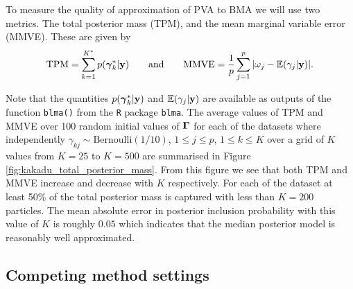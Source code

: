 \noindent To measure the quality of approximation of PVA to BMA we will use two
metrics. The total posterior mass (TPM), and the mean marginal variable error
(MMVE). These are given by $$ \displaystyle \mbox{TPM} = \sum_{k=1}^{K^*}
p({\boldsymbol \gamma}_k^*|{\bf y}) \qquad \mbox{and}  \qquad \mbox{MMVE} = \frac{1}{p}
\sum_{j=1}^p |\omega_j - {\mathbb E}(\gamma_j|{\bf y}) |.  $$

\noindent Note that the quantities $p({\boldsymbol \gamma}_k^*|{\bf y})$ and ${\mathbb E}(\gamma_j|{\bf y})$
are available as outputs of the function {\tt blma()} from the {\tt R} package
{\tt blma}.  The average values of TPM and MMVE over 100 random initial values
of ${\boldsymbol \Gamma}$ for each of the datasets where independently $\gamma_{kj} \sim
\mbox{Bernoulli}(1/10)$, $1\le j\le p$, $1\le k\le K$ over a grid of $K$ values
from $K=25$ to $K=500$ are summarised in Figure
\ref{fig:kakadu_total_posterior_mass}.  From this figure we see that both TPM
and MMVE increase and decrease with $K$ respectively. For each of the dataset
at least 50\% of the total posterior mass is captured with less than $K=200$
particles.  The mean absolute error in posterior inclusion probability with
this value of $K$ is roughly $0.05$ which indicates that the median posterior
model is reasonably well approximated.

	
	
	
	

\subsection{Competing method settings}
\label{sec:settings} 


